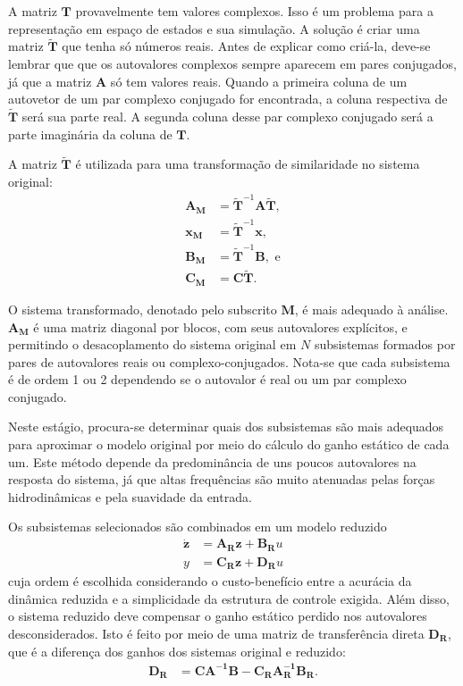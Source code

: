  A matriz $\mathbf{T}$ provavelmente tem valores complexos. Isso é um problema para a representação em espaço de estados e sua simulação. A solução é criar uma matriz $\mathbf{\tilde{T}}$ que tenha só números reais. Antes de explicar como criá-la, deve-se lembrar que que os autovalores complexos sempre aparecem em pares conjugados, já que a matriz $\mathbf{A}$ só tem valores reais. Quando a primeira coluna de um autovetor de um par complexo conjugado for encontrada, a coluna respectiva de $\mathbf{\tilde{T}}$ será sua parte real. A segunda coluna desse par complexo conjugado será a parte imaginária da coluna de $\mathbf{T}$.


 A matriz $\mathbf{\tilde{T}}$ é utilizada para uma transformação de similaridade no sistema original: \begin{align}
	\mathbf{A_M} &= \mathbf{\tilde{T}}^{-1}\mathbf{A}\mathbf{\tilde{T}},\\
	\mathbf{x_M} &=\mathbf{\tilde{T}}^{-1}\mathbf{x},	\\
	\mathbf{B_M} &= \mathbf{\tilde{T}}^{-1}\mathbf{B},\textrm{ e}\\
	\mathbf{C_M} &=\mathbf{C}\mathbf{\tilde{T}}.
\end{align}


 O sistema transformado, denotado pelo subscrito $\mathbf{M}$, é mais adequado à análise. $\mathbf{A_M}$ é uma matriz diagonal por blocos, com seus autovalores explícitos, e permitindo o desacoplamento do sistema original em $N$ subsistemas formados por pares de autovalores reais ou complexo-conjugados. Nota-se que cada subsistema é de ordem 1 ou 2 dependendo se o autovalor é real ou um par complexo conjugado.

 Neste estágio, procura-se determinar quais dos subsistemas são mais adequados para aproximar o modelo original por meio do cálculo do ganho estático de cada um. Este método depende da predominância de uns poucos autovalores na resposta do sistema, já que altas frequências são muito atenuadas pelas forças hidrodinâmicas e pela suavidade da entrada.

 Os subsistemas selecionados são combinados em um modelo reduzido \begin{align}
	\mathbf{\dot{z}} &= \mathbf{A_R}\mathbf{z}+\mathbf{B_R}u\\
	y &= \mathbf{C_R}\mathbf{z}+\mathbf{D_R}u
\end{align} cuja ordem é escolhida considerando o custo-benefício entre a acurácia da dinâmica reduzida e a simplicidade da estrutura de controle exigida. Além disso, o sistema reduzido deve compensar o ganho estático perdido nos autovalores desconsiderados. Isto é feito por meio de uma matriz de transferência direta $\mathbf{D_R}$, que é a diferença dos ganhos dos sistemas original e reduzido: \begin{align}
	\mathbf{D_R}&=\mathbf{C}\mathbf{A^{-1}}\mathbf{B}-\mathbf{C_R}\mathbf{A_R^{-1}}\mathbf{B_R}.
\end{align}


